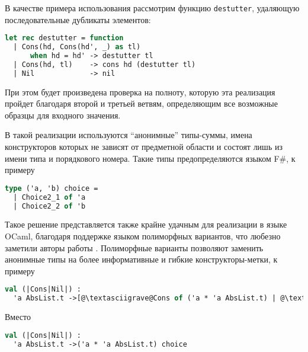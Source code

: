 В качестве примера использования рассмотрим функцию \lstinline|destutter|, удаляющую последовательные дубликаты элементов: 

\noindent
\begin{minipage}{\linewidth}
\begin{lstlisting}[language=ocaml]
let rec destutter = function
  | Cons(hd, Cons(hd', _) as tl) 
      when hd = hd' -> destutter tl
  | Cons(hd, tl)    -> cons hd (destutter tl)
  | Nil             -> nil
\end{lstlisting}
\end{minipage}

При этом будет произведена проверка на полноту, которую эта реализация пройдет благодаря второй и третьей ветвям, определяющим все возможные образцы для входного значения.

В такой реализации используются ``анонимные'' типы-суммы, имена конструкторов которых не зависят от предметной области и состоят лишь из имени типа и порядкового номера. Такие типы предопределяются языком F\#, к примеру

\noindent
\begin{minipage}{\linewidth}
\begin{lstlisting}[language=ocaml]
type ('a, 'b) choice =
  | Choice2_1 of 'a
  | Choice2_2 of 'b
\end{lstlisting}
\end{minipage}

Такое решение представляется также крайне удачным для реализации в языке OCaml, благодаря поддержке языком полиморфных вариантов, что любезно заметили авторы работы \cite{syme2007extensible}. Полиморфные варианты позволяют заменить анонимные типы на более информативные и гибкие конструкторы-метки, к примеру

\noindent
\begin{minipage}{\linewidth}
\begin{lstlisting}[language=ocaml,escapechar=@]
val (|Cons|Nil|) : 
  'a AbsList.t ->[@\textasciigrave@Cons of ('a * 'a AbsList.t) | @\textasciigrave@Nil]
\end{lstlisting}
\end{minipage}

Вместо

\noindent
\begin{minipage}{\linewidth}
\begin{lstlisting}[language=ocaml]
val (|Cons|Nil|) : 
  'a AbsList.t ->('a * 'a AbsList.t) choice
\end{lstlisting}
\end{minipage}

